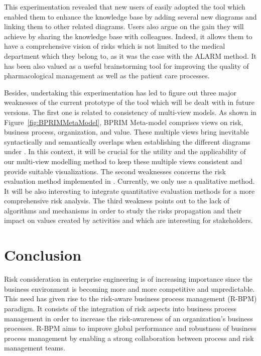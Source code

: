 \documentclass[preprint,3p,times,number]{elsarticle}
\begin{document}
This experimentation revealed that new users of \adobprim{} easily adopted the tool which enabled them to enhance the knowledge base by adding several new diagrams and linking them to other related diagrams. Users also argue on the gain they will achieve by sharing the knowledge base with colleagues. Indeed, it allows them to have a comprehensive vision of risks which is not limited to the medical department which they belong to, as it was the case with the ALARM method. It has been also valued as a useful brainstorming tool for improving the quality of pharmacological management as well as the patient care processes.

Besides, undertaking this experimentation has led to figure out three major weaknesses of the current prototype of the \adobprim{} tool which will be dealt with in future versions. The first one is related to consistency of multi-view models. As shown in Figure~\ref{fig:BPRIMMetaModel}, BPRIM Meta-model comprises views on risk, business process, organization, and value. These multiple views bring inevitable syntactically and semantically overlaps  when establishing the different diagrams under \adobprim{}. In this context, it will be crucial for the utility and the applicability of our multi-view modelling method to keep these multiple views consistent and provide suitable visualizations. The second weaknesses concerns the risk evaluation method implemented in \adobprim{}. Currently, we only use a qualitative method. It will be also interesting to integrate quantitative evaluation methods for a more comprehensive risk analysis. The third weakness points out to the lack of algorithms and mechanisms in order to study the risks propagation and their impact on values created by activities and which are interesting for stakeholders.

\section{Conclusion}
\label{sec:conclusion}
Risk consideration in enterprise engineering is of increasing importance since the business environment is becoming more and more competitive and unpredictable. This need has given rise to the risk-aware business process management (R-BPM) paradigm. It consists of the integration of risk aspects into business process management in order to increase the risk-awareness of an organization's business processes. R-BPM aims to improve global performance and robustness of business process management by enabling a strong collaboration between process and risk management teams.
\end{document}
